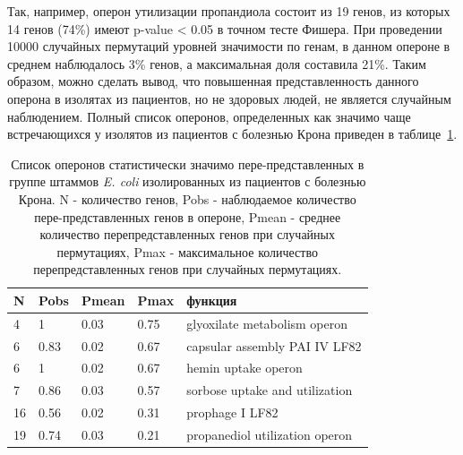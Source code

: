 Так, например, оперон утилизации пропандиола состоит из 19 генов, из которых 14 генов (74\%) имеют p-value < 0.05 в точном тесте Фишера. При проведении 10000 случайных пермутаций уровней значимости по генам, в данном опероне в среднем наблюдалось 3\% генов, а максимальная доля составила 21\%. Таким образом, можно сделать вывод, что повышенная представленность данного оперона в изолятах из пациентов, но не здоровых людей, не является случайным наблюдением. Полный список оперонов, определенных как значимо чаще встречающихся у изолятов из пациентов с болезнью Крона приведен в таблице~\ref{tbl:ops1}. 

\begin{table}[htbp]
\centering
\caption{Список оперонов статистически значимо пере-представленных в группе штаммов \textit{E. coli} изолированных из пациентов с болезнью Крона. N - количество генов, Pobs - наблюдаемое количество пере-представленных генов в опероне, Pmean - среднее количество перепредставленных генов при случайных пермутациях, Pmax - максимальное количество перепредставленных генов при случайных пермутациях.}
\label{tbl:ops1}
\begin{tabular}{|l|l|l|l|l|}
\hline
\textbf{N} & \textbf{Pobs} & \textbf{Pmean} & \textbf{Pmax} & \textbf{функция}                                  \\ \hline
4          & 1             & 0.03          & 0.75         & glyoxilate metabolism operon \\ \hline
6          & 0.83          & 0.02          & 0.67         & capsular assembly PAI IV LF82                              \\ \hline
6          & 1             & 0.02          & 0.67         & hemin uptake operon                                       \\ \hline
7          & 0.86          & 0.03          & 0.57         & sorbose uptake and utilization                             \\ \hline
16         & 0.56          & 0.02          & 0.31         & prophage I LF82                                            \\ \hline
19         & 0.74          & 0.03          & 0.21         & propanediol utilization operon                         \\ \hline
\end{tabular}
\end{table}


\FloatBarrier
{}                                  %


